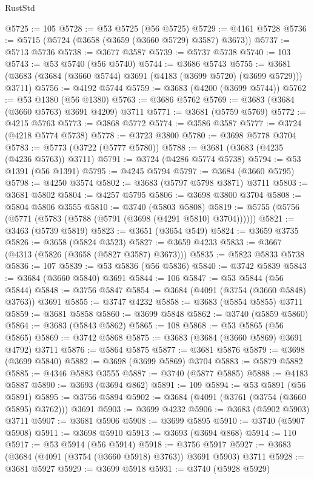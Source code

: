 \begin{lexlean}{RustStd}
\begin{coremodule}
{\begin{coremodule}
{{{{{{{{{{{{{{{{{{{{{{{{{{{{{{{{{{{{{{{{{{{{{{{@5725 := 105
@5728 := @53 @5725 (@56 @5725)
@5729 := @4161 @5728
@5736 := @5715 (@5724 (@3658 (@3659 (@3660 @5729) @3587) @3673))
@5737 := @5713 @5736
@5738 := @3677 @3587
@5739 := @5737 @5738
@5740 := 103
@5743 := @53 @5740 (@56 @5740)
@5744 := @3686 @5743
@5755 := @3681 (@3683 (@3684 (@3660 @5744) @3691 (@4183 (@3699 @5720) (@3699 @5729))) @3711)
@5756 := @4192 @5744
@5759 := @3683 (@4200 (@3699 @5744))
@5762 := @53 @1380 (@56 @1380)
@5763 := @3686 @5762
@5769 := @3683 (@3684 (@3660 @5763) @3691 @4209) @3711
@5771 := @3681 (@5759 @5769)
@5772 := @4215 @5763
@5773 := @3868 @5772
@5774 := @3586 @3587
@5777 := @3724 (@4218 @5774 @5738)
@5778 := @3723 @3800
@5780 := @3698 @5778 @3704
@5783 := @5773 (@3722 (@5777 @5780))
@5788 := @3681 (@3683 (@4235 (@4236 @5763)) @3711)
@5791 := @3724 (@4286 @5774 @5738)
@5794 := @53 @1391 (@56 @1391)
@5795 := @4245 @5794
@5797 := @3684 (@3660 @5795)
@5798 := @4250 @3574
@5802 := @3683 (@5797 @5798 @3871) @3711
@5803 := @3681 @5802
@5804 := @4257 @5795
@5806 := @3698 @3800 @3704
@5808 := @5804 @5806 @3555
@5810 := @3740 (@5803 @5808)
@5819 := @5755 (@5756 (@5771 (@5783 (@5788 (@5791 (@3698 (@4291 @5810) @3704))))))
@5821 := @3463 (@5739 @5819)
@5823 := @3651 (@3654 @549)
@5824 := @3659 @3735
@5826 := @3658 (@5824 @3523)
@5827 := @3659 @4233
@5833 := @3667 (@4313 (@5826 (@3658 (@5827 @3587) @3673)))
@5835 := @5823 @5833 @5738
@5836 := 107
@5839 := @53 @5836 (@56 @5836)
@5840 := @3742 @5839
@5843 := @3684 (@3660 @5840) @3691
@5844 := 106
@5847 := @53 @5844 (@56 @5844)
@5848 := @3756 @5847
@5854 := @3684 (@4091 (@3754 (@3660 @5848) @3763)) @3691
@5855 := @3747 @4232
@5858 := @3683 (@5854 @5855) @3711
@5859 := @3681 @5858
@5860 := @3699 @5848
@5862 := @3740 (@5859 @5860)
@5864 := @3683 (@5843 @5862)
@5865 := 108
@5868 := @53 @5865 (@56 @5865)
@5869 := @3742 @5868
@5875 := @3683 (@3684 (@3660 @5869) @3691 @4792) @3711
@5876 := @5864 @5875
@5877 := @3681 @5876
@5879 := @3698 (@3699 @5840)
@5882 := @3698 (@3699 @5869) @3704
@5883 := @5879 @5882
@5885 := @4346 @5883 @3555
@5887 := @3740 (@5877 @5885)
@5888 := @4183 @5887
@5890 := @3693 (@3694 @862)
@5891 := 109
@5894 := @53 @5891 (@56 @5891)
@5895 := @3756 @5894
@5902 := @3684 (@4091 (@3761 (@3754 (@3660 @5895) @3762))) @3691
@5903 := @3699 @4232
@5906 := @3683 (@5902 @5903) @3711
@5907 := @3681 @5906
@5908 := @3699 @5895
@5910 := @3740 (@5907 @5908)
@5911 := @3698 @5910
@5913 := @3693 (@3694 @868)
@5914 := 110
@5917 := @53 @5914 (@56 @5914)
@5918 := @3756 @5917
@5927 := @3683 (@3684 (@4091 (@3754 (@3660 @5918) @3763)) @3691 @5903) @3711
@5928 := @3681 @5927
@5929 := @3699 @5918
@5931 := @3740 (@5928 @5929)
}}}}}}}}}}}}}}}}}}}}}}}}}}}}}}}}}}}}}}}}}}}}}}}
\end{coremodule}}
\end{coremodule}
\end{lexlean}

